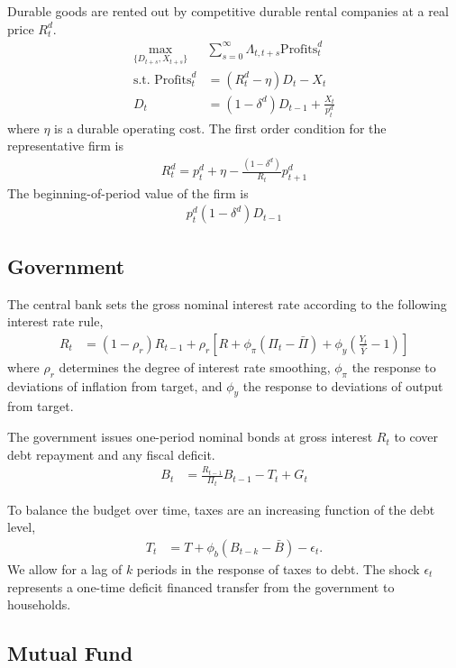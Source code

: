 \documentclass[11pt]{article}
\begin{document}
Durable goods are rented out by competitive durable rental companies at a real price $R_t^d$.
\begin{align*}
	\max_{\{D_{t+s},X_{t+s}\}} &\sum_{s=0}^{\infty}  \Lambda_{t,t+s} \text{Profits}_t^d\\
	\text{s.t. } \text{Profits}_t^d &= \left(R_{t}^d - \eta\right) D_{t} - X_t\\
	D_t &=  (1-\delta^d)D_{t-1} + \frac{X_t}{p_t^d} 
\end{align*}
where $\eta$ is a durable operating cost. The first order condition for the representative firm is
\begin{align*}
	R_{t}^d = p_t^d + \eta -\frac{(1-\delta^d)}{R_t}p_{t+1}^d
\end{align*}
The beginning-of-period value of the firm is
\begin{align*}
	p_t^d (1-\delta^d) D_{t-1}
\end{align*}



\subsection{Government}

The central bank sets the gross nominal interest rate according to the following interest rate rule,
\begin{align*}
	R_t &= (1-\rho_r)R_{t-1} + \rho_r\left[R + \phi_\pi(\Pi_t-\bar{\Pi}) + \phi_y\left(\frac{Y_t}{\bar{Y}}-1\right)\right]
\end{align*}
where $\rho_r$ determines the degree of interest rate smoothing, $\phi_\pi$ the response to deviations of inflation from target, and $\phi_y$ the response to deviations of output from target.

The government issues one-period nominal bonds at gross interest $R_t$ to cover debt repayment and any fiscal deficit.
\begin{align*}
	B_t &= \frac{R_{t-1}}{\Pi_t}B_{t-1} - T_t + G_t
\end{align*}

To balance the budget over time, taxes are an increasing function of the debt level,
\begin{align*}
	T_t &= T + \phi_b(B_{t-k}-\bar{B}) - \epsilon_t.
\end{align*}
We allow for a lag of $k$ periods in the response of taxes to debt. The shock $\epsilon_t$ represents a one-time deficit financed transfer from the government to households.

\subsection{Mutual Fund}
\end{document}
